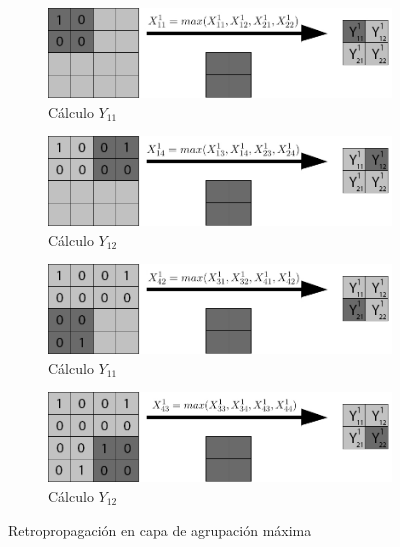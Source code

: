 \begin{figure}[H]
	\centering
	\begin{subfigure}{.5\textwidth}
		\hspace{-10mm}
		\includegraphics[width=1.2\linewidth]{imagenes/back_maxpool_1.jpg}  
		\caption{Cálculo $Y_{11}$}
	\end{subfigure}%
	\begin{subfigure}{.5\textwidth}
		\hspace{10mm}
		\includegraphics[width=1.2\linewidth]{imagenes/back_maxpool_2.jpg}  
		\caption{Cálculo $Y_{12}$}
	\end{subfigure}
	
	\begin{subfigure}{.5\textwidth}
		\hspace{-10mm}
		\includegraphics[width=1.2\linewidth]{imagenes/back_maxpool_3.jpg}  
		\caption{Cálculo $Y_{11}$}
	\end{subfigure}%
	\begin{subfigure}{.5\textwidth}
		\hspace{10mm}
		\includegraphics[width=1.2\linewidth]{imagenes/back_maxpool_4.jpg}  
		\caption{Cálculo $Y_{12}$}
	\end{subfigure}%
	\caption{Retropropagación en capa de agrupación máxima}
	\label{fig:back_prop_maxpool}
\end{figure}


